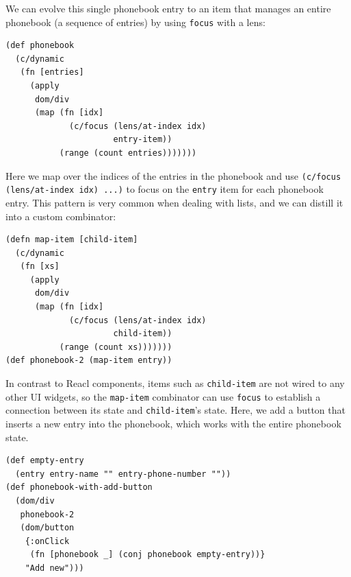 \documentclass[sigplan,review,screen]{acmart}
\begin{document}
%
We can evolve this
single phonebook entry to an item that manages an
entire phonebook (a sequence of entries) by using \texttt{focus}
with a lens:
%
\begin{verbatim}
(def phonebook
  (c/dynamic
   (fn [entries]
     (apply
      dom/div
      (map (fn [idx]
             (c/focus (lens/at-index idx)
                      entry-item))
           (range (count entries)))))))
\end{verbatim}
%
Here we map over the indices of the entries in the phonebook and use
\texttt{(c/focus (lens/at-index idx) ...)} to focus on the \texttt{entry}
item for each phonebook entry.
%
This pattern is very common when
dealing with lists, and we can
distill it into a custom combinator:
%
\begin{verbatim}
(defn map-item [child-item]
  (c/dynamic
   (fn [xs]
     (apply
      dom/div
      (map (fn [idx]
             (c/focus (lens/at-index idx)
                      child-item))
           (range (count xs)))))))
(def phonebook-2 (map-item entry))
\end{verbatim}
%
In contrast to Reacl components, items such as \texttt{child-item} are
not wired to any other UI widgets, so the \texttt{map-item} combinator
can use \texttt{focus} to establish a connection between its state and
\texttt{child-item}'s state.
Here, we add
a button that inserts a new entry into the
phonebook, which works with the entire phonebook state.
%
\begin{verbatim}
(def empty-entry
  (entry entry-name "" entry-phone-number ""))
(def phonebook-with-add-button
  (dom/div
   phonebook-2
   (dom/button
    {:onClick
     (fn [phonebook _] (conj phonebook empty-entry))}
    "Add new")))
\end{verbatim}
%
\end{document}
